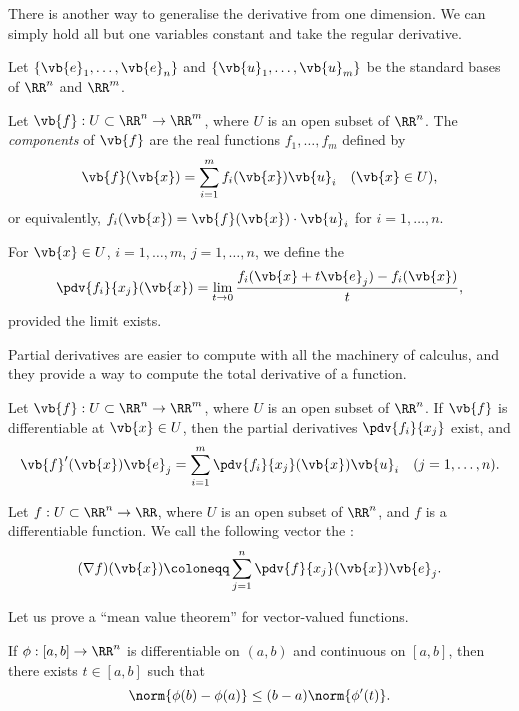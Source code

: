 There is another way to generalise the derivative from one dimension. We can simply hold all but one variables constant and take the regular derivative.

Let $\{\vb{e}_1,\dots,\vb{e}_n\}$ and $\{\vb{u}_1,\dots,\vb{u}_m\}$ be the standard bases of $\RR^n$ and $\RR^m$.

\begin{definition}
Let $\vb{f}:U\subset\RR^n\to\RR^m$, where $U$ is an open subset of $\RR^n$. The \emph{components} of $\vb{f}$ are the real functions $f_1,\dots,f_m$ defined by
\[\vb{f}(\vb{x})=\sum_{i=1}^{m}f_i(\vb{x})\vb{u}_i\quad(\vb{x}\in U),\]
or equivalently, $f_i(\vb{x})=\vb{f}(\vb{x})\cdot\vb{u}_i$ for $i=1,\dots,n$.

For $\vb{x}\in U$, $i=1,\dots,m$, $j=1,\dots,n$, we define the 
\[\pdv{f_i}{x_j}(\vb{x})=\lim_{t\to0}\frac{f_i(\vb{x}+t\vb{e}_j)-f_i(\vb{x})}{t},\]
provided the limit exists.
\end{definition}

Partial derivatives are easier to compute with all the machinery of calculus, and they provide a way to compute the total derivative of a function.

\begin{proposition}
Let $\vb{f}:U\subset\RR^n\to\RR^m$, where $U$ is an open subset of $\RR^n$. If $\vb{f}$ is differentiable at $\vb{x}\in U$, then the partial derivatives $\pdv{f_i}{x_j}$ exist, and
\[\vb{f}^\prime(\vb{x})\vb{e}_j=\sum_{i=1}^{m}\pdv{f_i}{x_j}(\vb{x})\vb{u}_i\quad(j=1,\dots,n).\]
\end{proposition}

\begin{definition}[Gradient]
Let $f:U\subset\RR^n\to\RR$, where $U$ is an open subset of $\RR^n$, and $f$ is a differentiable function. We call the following vector the :
\[(\nabla f)(\vb{x})\coloneqq\sum_{j=1}^{n}\pdv{f}{x_j}(\vb{x})\vb{e}_j.\]
\end{definition}

Let us prove a ``mean value theorem'' for vector-valued functions.

\begin{theorem}
If $\phi:[a,b]\to\RR^n$ is differentiable on $(a,b)$ and continuous on $[a,b]$, then there exists $t\in[a,b]$ such that
\begin{equation}
\norm{\phi(b)-\phi(a)}\le(b-a)\norm{\phi^\prime(t)}.
\end{equation}
\end{theorem}

